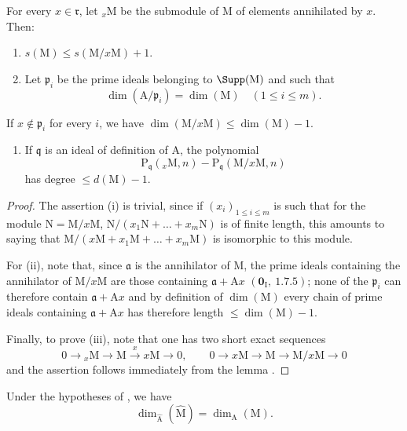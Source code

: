 \begin{lemma}[16.2.3.1]
\label{0.16.2.3.1}
For every $x\in\mathfrak{r}$, let ${}_x\mathrm{M}$ be the submodule of $\mathrm{M}$ of elements annihilated by $x$.
Then:
\begin{enumerate}
  \item[\rm{(i)}] $s(\mathrm{M})\leq s(\mathrm{M}/x\mathrm{M})+1$.
  \item[\rm{(ii)}] Let $\mathfrak{p}_i$ be the prime ideals belonging to $\Supp(\mathrm{M})$ and such that
  \[
    \dim(\mathrm{A}/\mathfrak{p}_i)=\dim(\mathrm{M})\quad(1\leq i\leq m).
  \]
\end{enumerate}
If $x\notin\mathfrak{p}_i$ for every $i$, we have $\dim(\mathrm{M}/x\mathrm{M})\leq\dim(\mathrm{M})-1$.
\begin{enumerate}
  \item[\rm{(iii)}] If $\mathfrak{q}$ is an ideal of definition of $\mathrm{A}$, the polynomial
  \[
    \mathrm{P}_\mathfrak{q}({}_x\mathrm{M},n)-\mathrm{P}_\mathfrak{q}(\mathrm{M}/x\mathrm{M},n)
  \]
  has degree $\leq d(\mathrm{M})-1$.
\end{enumerate}
\end{lemma}

\begin{proof}
The assertion (i) is trivial, since if $(x_i)_{1\leq i\leq m}$ is such that for the module $\mathrm{N}=\mathrm{M}/x\mathrm{M}$, $\mathrm{N}/(x_1\mathrm{N}+\ldots+x_m\mathrm{N})$ is of finite length, this amounts to saying that $\mathrm{M}/(x\mathrm{M}+x_1\mathrm{M}+\ldots+x_m\mathrm{M})$ is isomorphic to this module.

For (ii), note that, since $\mathfrak{a}$ is the annihilator of $\mathrm{M}$, the prime ideals containing the annihilator of $\mathrm{M}/x\mathrm{M}$ are those containing $\mathfrak{a}+\mathrm{A}x$ $(\mathbf{0}_\mathrm{I},~1.7.5)$; none of the $\mathfrak{p}_i$ can therefore contain $\mathfrak{a}+\mathrm{A}x$ and by definition of $\dim(\mathrm{M})$  every chain of prime ideals containing $\mathfrak{a}+\mathrm{A}x$ has therefore length $\leq\dim(\mathrm{M})-1$.

Finally, to prove (iii), note that one has two short exact sequences
\[
  0\to{}_x\mathrm{M}\to\mathrm{M}\xrightarrow{x}x\mathrm{M}\to 0,\qquad 0\to x\mathrm{M}\to\mathrm{M}\to\mathrm{M}/x\mathrm{M}\to 0
\]
and the assertion follows immediately from the lemma .
\end{proof}

\begin{corollary}[16.2.4]
\label{0.16.2.4}
Under the hypotheses of , we have
\begin{equation}
\label{0.16.2.4.1}
\tag{16.2.4.1}
  \dim_{\widehat{\mathrm{A}}}(\widehat{\mathrm{M}})=\dim_\mathrm{A}(\mathrm{M}).
\end{equation}
\end{corollary}

